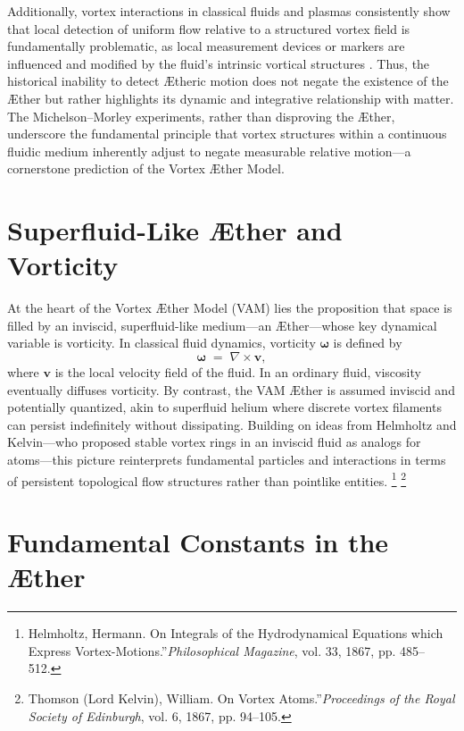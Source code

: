 \documentclass[a4paper,12pt]{article}
\begin{document}
Additionally, vortex interactions in classical fluids and plasmas consistently show that local detection of uniform flow relative to a structured vortex field is fundamentally problematic, as local measurement devices or markers are influenced and modified by the fluid's intrinsic vortical structures \cite{Meunier2005}. Thus, the historical inability to detect Ætheric motion does not negate the existence of the Æther but rather highlights its dynamic and integrative relationship with matter. The Michelson--Morley experiments, rather than disproving the Æther, underscore the fundamental principle that vortex structures within a continuous fluidic medium inherently adjust to negate measurable relative motion---a cornerstone prediction of the Vortex Æther Model.


\section{Superfluid-Like Æther and Vorticity}

At the heart of the Vortex Æther Model (VAM) lies the proposition that space is filled by an inviscid, superfluid-like medium—an Æther—whose key dynamical variable is vorticity. In classical fluid dynamics, vorticity \(\boldsymbol{\omega}\) is defined by
\[
    \boldsymbol{\omega} \;=\; \nabla \times \mathbf{v},
\]
where \(\mathbf{v}\) is the local velocity field of the fluid. In an ordinary fluid, viscosity eventually diffuses vorticity. By contrast, the VAM Æther is assumed inviscid and potentially quantized, akin to superfluid helium where discrete vortex filaments can persist indefinitely without dissipating. Building on ideas from Helmholtz and Kelvin—who proposed stable vortex rings in an inviscid fluid as analogs for atoms—this picture reinterprets fundamental particles and interactions in terms of persistent topological flow structures rather than pointlike entities.
\footnote{Helmholtz, Hermann. \grqq On Integrals of the Hydrodynamical Equations which Express Vortex-Motions.\textquotedblright \textit{Philosophical Magazine}, vol. 33, 1867, pp. 485–512.}
\footnote{Thomson (Lord Kelvin), William. \grqq On Vortex Atoms.\textquotedblright \textit{Proceedings of the Royal Society of Edinburgh}, vol. 6, 1867, pp. 94–105.}

\section{Fundamental Constants in the Æther}
\end{document}
